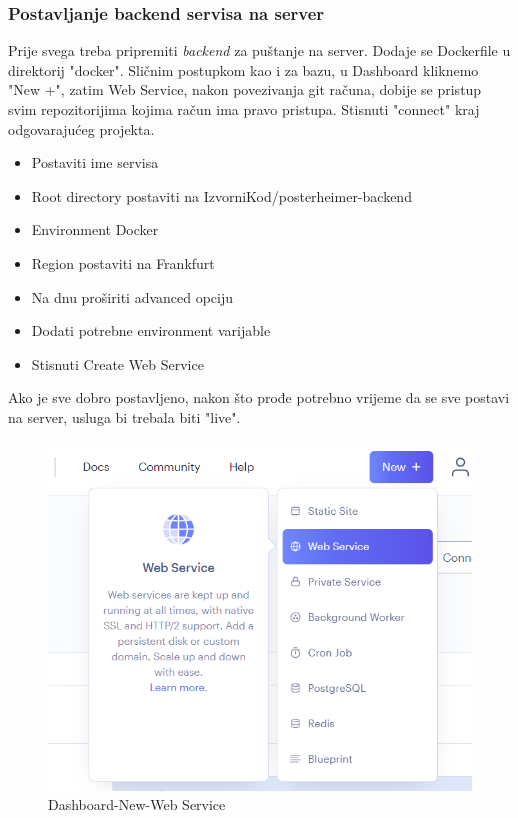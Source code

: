 			\subsubsection{Postavljanje backend servisa na server}
			Prije svega treba pripremiti \textit{backend} za puštanje na server. Dodaje se Dockerfile u direktorij "docker". Sličnim postupkom kao i za bazu, u Dashboard kliknemo "New +", zatim Web Service, nakon povezivanja git računa, dobije se pristup svim repozitorijima kojima račun ima pravo pristupa. Stisnuti "connect" kraj odgovarajućeg projekta.
			\begin{itemize}
			\item Postaviti ime servisa
			\item Root directory postaviti na IzvorniKod/posterheimer-backend
			\item Environment Docker
			\item Region postaviti na Frankfurt
			\item Na dnu proširiti advanced opciju
			\item Dodati potrebne environment varijable
			\item Stisnuti Create Web Service
			\end{itemize}
			Ako je sve dobro postavljeno, nakon što prođe potrebno vrijeme da se sve postavi na server, usluga bi trebala biti "live". 
			\newpage
			\begin{figure} [h]
				\includegraphics[width=\linewidth]{Slike/Dashboard-New-Web Service}
				\caption{Dashboard-New-Web Service }
			\end{figure}

